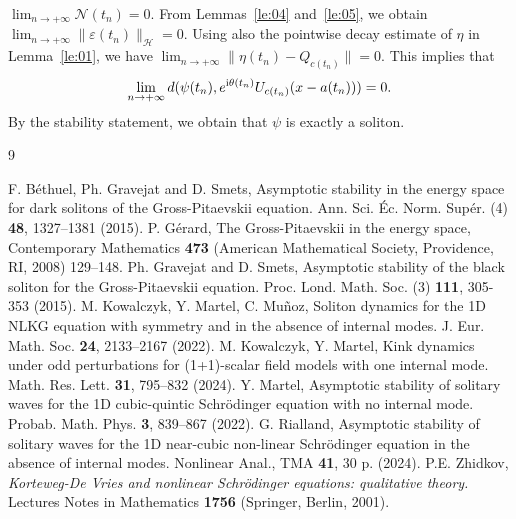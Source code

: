 \documentclass[11pt]{amsart}
\theoremstyle{remark}
\newcommand\cH{\mathcal{H}}
\newcommand\cN{\mathcal{N}}
\newcommand\ep{\varepsilon}
\newcommand\ii{\textnormal{i}}
\begin{document}
$\lim_{n\to+\infty} \cN(t_n)=0$.
From Lemmas~\ref{le:04} and~\ref{le:05}, we obtain
$\lim_{n\to+\infty} \|\ep(t_n)\|_\cH=0$.
Using also the pointwise decay estimate of $\eta$ in Lemma~\ref{le:01},
we have $\lim_{n\to+\infty} \|\eta(t_n)-Q_{c(t_n)}\|=0$.
This implies that 
\[
\lim_{n\to+\infty}d(\psi(t_n),e^{\ii \theta(t_n)} U_{c(t_n)}(x-a(t_n)))=0.
\]
By the stability statement, we obtain
that $\psi$ is exactly a soliton.
 \begin{thebibliography}{9}

 F. Béthuel, Ph. Gravejat and D. Smets,
Asymptotic stability in the energy space for dark solitons of the Gross-Pitaevskii equation. 
Ann. Sci. Éc. Norm. Supér. (4) \textbf{48}, 1327--1381 (2015).
 P. Gérard,
The Gross-Pitaevskii in the energy space,
Contemporary Mathematics \textbf{473} (American Mathematical Society, Providence, RI, 2008) 129--148.
 Ph. Gravejat and D. Smets,
Asymptotic stability of the black soliton for the Gross-Pitaevskii equation.
Proc. Lond. Math. Soc. (3) \textbf{111}, 305-353 (2015).
 M. Kowalczyk, Y. Martel, C. Muñoz,
Soliton dynamics for the 1D NLKG equation with symmetry and in the absence of internal modes.
J. Eur. Math. Soc. \textbf{24}, 2133--2167 (2022).
 M. Kowalczyk, Y. Martel,
Kink dynamics under odd perturbations for (1+1)-scalar field models with one internal mode. Math. Res. Lett. \textbf{31}, 795--832 (2024).
 Y. Martel, Asymptotic stability of solitary waves for the 1D cubic-quintic Schrödinger equation with no internal mode.
Probab. Math. Phys. \textbf{3}, 839--867 (2022).
 G. Rialland, Asymptotic stability of solitary waves for the 1D near-cubic non-linear Schrödinger equation in the absence of internal modes. 
Nonlinear Anal., TMA \textbf{41}, 30 p. (2024).
 P.E. Zhidkov,
\emph{Korteweg-De Vries and nonlinear Schrödinger equations: qualitative theory.}
Lectures Notes in Mathematics \textbf{1756} (Springer, Berlin, 2001).

\end{thebibliography}
\end{document}

